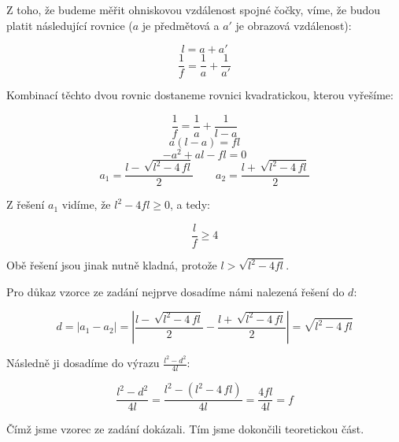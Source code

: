\documentclass{fkssolpub}
\author{Ondřej Sedláček}
\begin{document}
Z toho, že budeme měřit ohniskovou vzdálenost spojné čočky, víme, že budou platit následující rovnice ($a$ je předmětová a $a'$ je obrazová vzdálenost):

\[
	l = a + a'
\]
\[
	\frac{1}{f} = \frac{1}{a} + \frac{1}{a'}
\]

Kombinací těchto dvou rovnic dostaneme rovnici kvadratickou, kterou vyřešíme:

\[
	\frac{1}{f} = \frac{1}{a} + \frac{1}{l - a}
\]
\[
	a (l - a) = f l
\]
\[
	- a^2 + a l - fl = 0
\]
\[
	a_1 = \frac{l - \, \sqrt{l^{2}-4 \, f l}}{2} \qquad a_2 = \frac{l + \, \sqrt{l^{2} - 4 \, f l}}{2}
\]

Z řešení $a_1$ vidíme, že $l^2 - 4 fl \geq 0$, a tedy:

\[
	\frac{l}{f} \geq 4
\]

Obě řešení jsou jinak nutně kladná, protože $l > \sqrt{l^2 - 4 f l}$.

Pro důkaz vzorce ze zadání nejprve dosadíme námi nalezená řešení do $d$:

\[
	d = |a_1 - a_2| =  \left| \frac{l - \, \sqrt{l^{2}-4 \, f l}}{2} - \frac{l + \, \sqrt{l^{2} - 4 \, f l}}{2} \right| = \sqrt{l^{2} - 4 \, f l}
\]

Následně ji dosadíme do výrazu $\frac{l^2 - d^2}{4l}$:

\[
	\frac{l^2 - d^2}{4l} = \frac{l^2 - (l^{2} - 4 \, f l)}{4l} = \frac{4fl}{4l} = f
\]

Čímž jsme vzorec ze zadání dokázali. Tím jsme dokončili teoretickou část.
\end{document}
